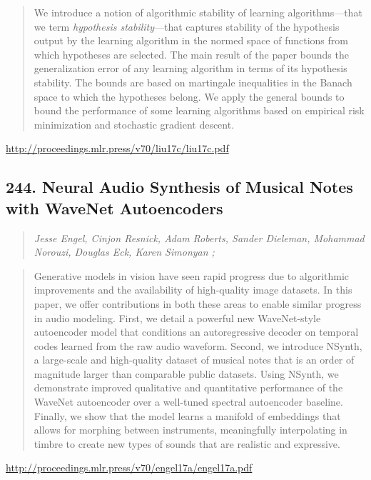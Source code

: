 \documentclass{article}
\begin{document}
\begin{quote}
    We introduce a notion of algorithmic stability of learning algorithms—that we term \textit{hypothesis stability}—that captures stability of the hypothesis output by the learning algorithm in the normed space of functions from which hypotheses are selected. The main result of the paper bounds the generalization error of any learning algorithm in terms of its hypothesis stability. The bounds are based on martingale inequalities in the Banach space to which the hypotheses belong. We apply the general bounds to bound the performance of some learning algorithms based on empirical risk minimization and stochastic gradient descent.  \end{quote}

\href{http://proceedings.mlr.press/v70/liu17c/liu17c.pdf}{http://proceedings.mlr.press/v70/liu17c/liu17c.pdf}

\subsection{244. Neural Audio Synthesis of Musical Notes with WaveNet Autoencoders}

\begin{quote}
\footnotesize{\textit{Jesse Engel, Cinjon Resnick, Adam Roberts, Sander Dieleman, Mohammad Norouzi, Douglas Eck, Karen Simonyan ;}}
\end{quote}

\begin{quote}
    Generative models in vision have seen rapid progress due to algorithmic improvements and the availability of high-quality image datasets. In this paper, we offer contributions in both these areas to enable similar progress in audio modeling. First, we detail a powerful new WaveNet-style autoencoder model that conditions an autoregressive decoder on temporal codes learned from the raw audio waveform. Second, we introduce NSynth, a large-scale and high-quality dataset of musical notes that is an order of magnitude larger than comparable public datasets. Using NSynth, we demonstrate improved qualitative and quantitative performance of the WaveNet autoencoder over a well-tuned spectral autoencoder baseline. Finally, we show that the model learns a manifold of embeddings that allows for morphing between instruments, meaningfully interpolating in timbre to create new types of sounds that are realistic and expressive.  \end{quote}

\href{http://proceedings.mlr.press/v70/engel17a/engel17a.pdf}{http://proceedings.mlr.press/v70/engel17a/engel17a.pdf}
\end{document}
